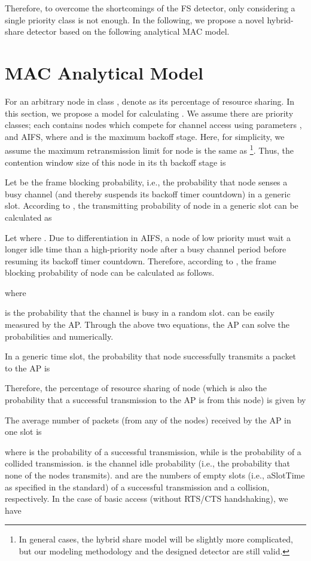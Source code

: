 \documentclass[conference]{IEEEtran}
\begin{document}
Therefore, to overcome the shortcomings of the FS detector, only considering a single priority class is not enough. In the following, we propose a novel hybrid-share detector based on the following analytical MAC model.

\section{MAC Analytical Model}\label{sec:model}
For an arbitrary node  in class , denote  as its percentage of resource sharing. In this section, we propose a model for calculating . We assume there are  priority classes; each contains  nodes which compete for channel access using parameters ,  and AIFS, where  and  is the maximum backoff stage. Here, for simplicity, we assume the maximum retransmission limit for node  is the same as \footnote{In general cases, the hybrid share model will be slightly more complicated, but our modeling methodology and the designed detector are still valid.}. Thus, the contention window size of this node in its th backoff stage is


Let  be the frame blocking probability, i.e., the probability that node  senses a busy channel (and thereby suspends its backoff timer countdown) in a generic slot. According to \cite{xiao2005performance}, the transmitting probability of node  in a generic slot can be calculated as



Let  where . Due to differentiation in AIFS, a node of low priority must wait a longer idle time than a high-priority node after a busy channel period before resuming its backoff timer countdown. Therefore, according to \cite{kosek2011simple}, the frame blocking probability of node  can be calculated as follows.

where

is the probability that the channel is busy in a random slot.  can be easily measured by the AP. Through the above two equations, the AP can solve the probabilities  and  numerically. 

In a generic time slot, the probability that node  successfully transmits a packet to the AP is

Therefore, the percentage of resource sharing of node  (which is also the probability that a successful transmission to the AP is from this node) is given by


The average number of packets (from any of the nodes) received by the AP in one slot is

where  is the probability of a successful transmission, while  is the probability of a collided transmission.  is the channel idle probability (i.e., the probability that none of the nodes transmits).  and  are the numbers of empty slots (i.e., aSlotTime as specified in the standard) of a successful transmission and a collision, respectively. In the case of basic access (without RTS/CTS handshaking), we have \cite{kosek2011simple}
\end{document}
